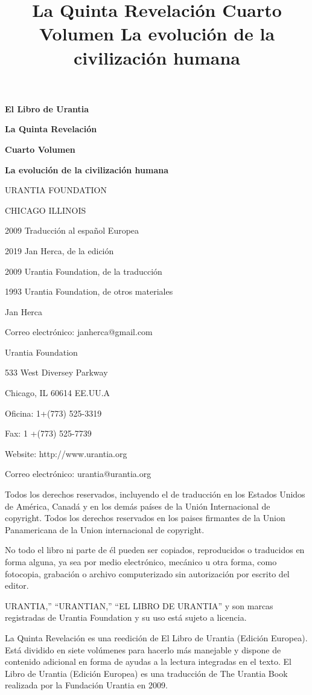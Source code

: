\documentclass[twoside, 11pt]{book}
\title{La Quinta Revelación \newline Cuarto Volumen \newline La evolución de la civilización humana}
\date{}
\begin{document}
	
	\begin{titlepage}
		\centering
		{\Huge\bfseries El Libro de Urantia\par}
		{\huge\bfseries La Quinta Revelación\par}
		\vspace{1cm}
		{\huge\bfseries Cuarto Volumen\par}
		\vspace{1cm}
		{\huge\bfseries La evolución de la civilización humana\par}
		\vfill
		{\scshape\Large URANTIA FOUNDATION\par}
		{\scshape\Large CHICAGO ILLINOIS\par}
		{\Large 2009 Traducción al español Europea\par}
	\end{titlepage}
	
	
\par {\textcopyright} 2019 Jan Herca, de la edición
\par {\textcopyright} 2009 Urantia Foundation, de la traducción
\par {\textcopyright} 1993 Urantia Foundation, de otros materiales
\bigbreak
\par Jan Herca
\par Correo electrónico: janherca@gmail.com
\bigbreak
\par Urantia Foundation
\par 533 West Diversey Parkway
\par Chicago, IL 60614 EE.UU.A
\par Oficina: 1+(773) 525-3319
\par Fax: 1 +(773) 525-7739
\par Website: http://www.urantia.org
\par Correo electrónico: urantia@urantia.org
\bigbreak
\par Todos los derechos reservados, incluyendo el de traducción en los Estados Unidos de América, Canadá y en los demás países de la Unión Internacional de copyright. Todos los derechos reservados en los paises firmantes de la Union Panamericana de la Union internacional de copyright.
\par No todo el libro ni parte de él pueden ser copiados, reproducidos o traducidos en forma alguna, ya sea por medio electrónico, mecánico u otra forma, como fotocopia, grabación o archivo computerizado sin autorización por escrito del editor.
\par URANTIA,'' ``URANTIAN,'' ``EL LIBRO DE URANTIA'' y son marcas registradas de Urantia Foundation y su uso está sujeto a licencia.
\bigbreak
\par La Quinta Revelación es una reedición de El Libro de Urantia (Edición Europea). Está dividido en siete volúmenes para hacerlo más manejable y dispone de contenido adicional en forma de ayudas a la lectura integradas en el texto. El Libro de Urantia (Edición Europea) es una traducción de The Urantia Book realizada por la Fundación Urantia en 2009. 
\newpage
\end{document}

